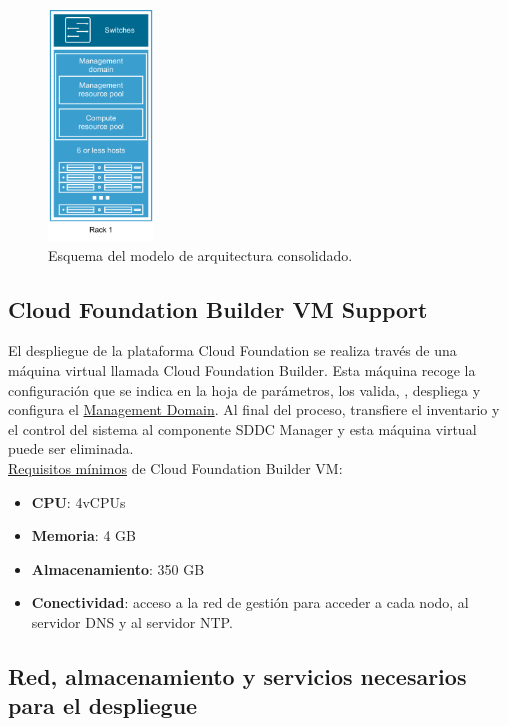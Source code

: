 \begin{figure}[h!]
  \centering
  \includegraphics[width=0.25\textwidth]{imaxes/conceptosPrevios/modelConsolidated.png}
  \caption{Esquema del modelo de arquitectura consolidado.}
  \label{fig:modeloconsolidated}
\end{figure}
\FloatBarrier

\subsection{Cloud Foundation Builder VM Support}
\label{subsec:cloudBuilder}
El despliegue de la plataforma Cloud Foundation se realiza través de una máquina virtual llamada Cloud Foundation Builder. Esta máquina recoge la configuración que se indica en la hoja de parámetros, los valida, , despliega y configura el \underline{Management Domain}. Al final del proceso, transfiere el inventario y el control del sistema al componente SDDC Manager y esta máquina virtual puede ser eliminada.\\
\underline{Requisitos mínimos} de Cloud Foundation Builder VM:
\begin{itemize}
    \item \textbf{CPU}: 4vCPUs
    \item \textbf{Memoria}: 4 GB
    \item \textbf{Almacenamiento}: 350 GB
    \item \textbf{Conectividad}: acceso a la red de gestión para acceder a cada nodo, al servidor DNS y al servidor NTP.
\end{itemize}

\subsection{Red, almacenamiento y servicios necesarios para el despliegue}

